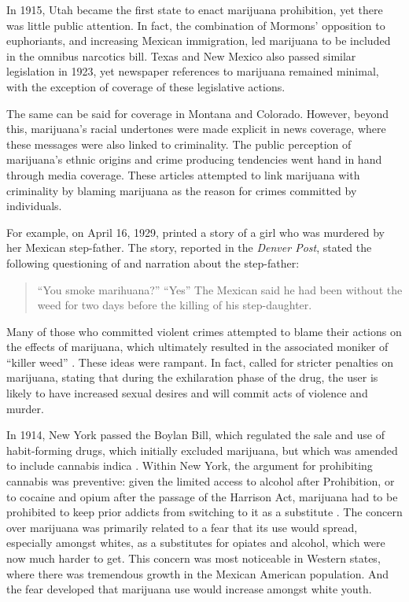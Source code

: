 In 1915, Utah became the first state to enact marijuana prohibition, yet there was little public attention. In fact, the combination of Mormons' opposition to euphoriants, and increasing Mexican immigration, led marijuana to be included in the omnibus narcotics bill. Texas and New Mexico also passed similar legislation in 1923, yet newspaper references to marijuana remained minimal, with the exception of coverage of these legislative actions. 

The same can be said for coverage in Montana and Colorado. However, beyond this, marijuana's racial undertones were made explicit in news coverage, where these messages were also linked to criminality. The public perception of marijuana's ethnic origins and crime producing tendencies went hand in hand through media coverage. These articles attempted to link marijuana with criminality by blaming marijuana as the reason for crimes committed by individuals.


For example, on April 16, 1929, printed a story of a girl who was murdered by her Mexican step-father. The story, reported in the \textit{Denver Post}, stated the following questioning of and narration about the step-father:

\begin{quotation}
\noindent ``You smoke marihuana?'' 
\noindent ``Yes'' 
\noindent  The Mexican said he had been without the weed for two days before the killing of his step-daughter.
\end{quotation}

Many of those who committed violent crimes attempted to blame their actions on the effects of marijuana, which ultimately resulted in the associated moniker of ``killer weed'' \citep{rusby_et_al_1930}. These ideas were rampant. In fact, \citet{hayes_and_bowery_1933} called for stricter penalties on marijuana, stating that during the exhilaration phase of the drug, the user is likely to have increased sexual desires and will commit acts of violence and murder.

In 1914, New York passed the Boylan Bill, which regulated the sale and use of habit-forming drugs, which initially excluded marijuana, but which was amended to include cannabis indica \citep{nyt_1914}. Within New York, the argument for prohibiting cannabis was preventive: given the limited access to alcohol after Prohibition, or to cocaine and opium after the passage of the Harrison Act, marijuana had to be prohibited to keep prior addicts from switching to it as a substitute \citep{bonnie_and_whitebread_1970}. The concern over marijuana was primarily related to a fear that its use would spread, especially amongst whites, as a substitutes for opiates and alcohol, which were now much harder to get. This concern was most noticeable in Western states, where there was tremendous growth in the Mexican American population. And the fear developed that marijuana use would increase amongst white youth. 

